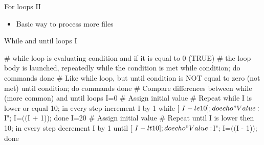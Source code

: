 \documentclass[compress, xelatex, 11pt, xcolor=svgnames, aspectratio=169, url={hyphens, lowtilde}]{beamer}
\begin{document}
\begin{frame}[fragile]{For loops II} %
	\begin{itemize}
		\item Basic way to process more files
	\end{itemize}
\end{frame}

\begin{frame}[fragile]{While and until loops I}
	\begin{bashcode}
    # while loop is evaluating condition and if it is equal to 0 (TRUE)
    # the loop body is launched, repeatedly while the condition is met
    while condition; do
        commands
      done
    # Like while loop, but until condition is NOT equal to zero (not met)
    until condition; do
      commands
      done
    # Compare differences between while (more common) and until loops
    I=0 # Assign initial value
    # Repeat while I is lower or equal 10; in every step increment I by 1
    while [ $I -le 10 ]; do echo "Value: $I"; I=$(($I + 1)); done
    I=20 # Assign initial value
    # Repeat until I is lower then 10; in every step decrement I by 1
    until [ $I -lt 10 ]; do echo "Value: $I"; I=$(($I - 1)); done
	\end{bashcode}
\end{frame}
\end{document}
